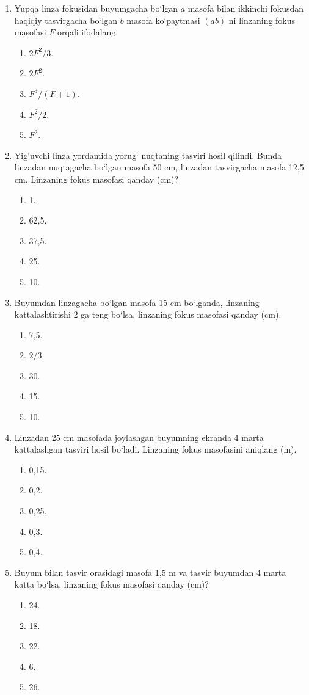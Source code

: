 \begin{enumerate}
\item Yupqa linza fokusidan buyumgacha bo‘lgan $a$ masofa bilan ikkinchi fokusdan haqiqiy tasvirgacha bo‘lgan $b$ masofa ko‘paytmasi $(ab)$ ni linzaning fokus masofasi $F$ orqali ifodalang.
\begin{enumerate}[label=\Alph*)]
\item $2F^2/3$.
\item $2F^2$.
\item $F^3/(F+1)$.
\item $F^2/2$.
\item $F^2$.
\end{enumerate}

\item Yig‘uvchi linza yordamida yorug‘ nuqtaning tasviri hosil qilindi. Bunda linzadan nuqtagacha bo‘lgan masofa 50 cm, linzadan tasvirgacha masofa 12,5 cm. Linzaning fokus masofasi qanday (cm)?
\begin{enumerate}[label=\Alph*)]
\item 1.
\item 62,5.
\item 37,5.
\item 25.
\item 10.
\end{enumerate}

\item Buyumdan linzagacha bo‘lgan masofa 15 cm bo‘lganda, linzaning kattalashtirishi 2 ga teng bo‘lsa, linzaning fokus masofasi qanday (cm).
\begin{enumerate}[label=\Alph*)]
\item 7,5.
\item $2/3$.
\item 30.
\item 15.
\item 10.
\end{enumerate}

\item Linzadan 25 cm masofada joylashgan buyumning ekranda 4 marta kattalashgan tasviri hosil bo‘ladi. Linzaning fokus masofasini aniqlang (m).
\begin{enumerate}[label=\Alph*)]
\item 0,15.
\item 0,2.
\item 0,25.
\item 0,3.
\item 0,4.
\end{enumerate}

\item Buyum bilan tasvir orasidagi masofa 1,5 m va tasvir buyumdan 4 marta katta bo‘lsa, linzaning fokus masofasi qanday (cm)?
\begin{enumerate}[label=\Alph*)]
\item 24.
\item 18.
\item 22.
\item 6.
\item 26.
\end{enumerate}


\end{enumerate}

